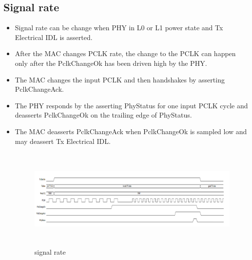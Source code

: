 \subsection{Signal rate}
\begin{itemize}
    \item Signal rate can be change when PHY in L0 or L1 power state and Tx Electrical IDL is asserted.

    \item After the MAC changes PCLK rate, the change to the PCLK can happen only after the PclkChangeOk has been driven high by the PHY.

    \item The MAC changes the input PCLK and then handshakes by asserting PclkChangeAck.

    \item The PHY responds by the asserting PhyStatus for one input PCLK cycle and deasserts PclkChangeOk on the trailing edge of PhyStatus.

    \item The MAC deasserts PclkChangeAck when PclkChangeOk is sampled low and may deassert Tx Electrical IDL.

\begin{figure}[H]
  \centering
  \includegraphics[width=130mm,height=50mm]{images/clk_diagram/rate.png}
  \caption{signal rate}
  \label{lane}
\end{figure}
\end{itemize}
